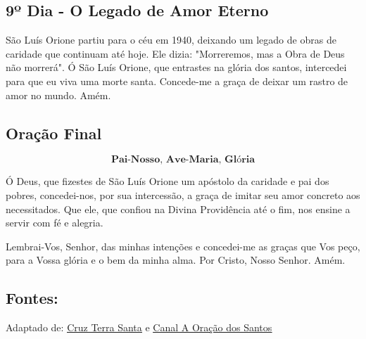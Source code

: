 \documentclass[a4paper,14pt]{extarticle} \usepackage[utf8]{inputenc}
\begin{document}
\underline{}


\subsection{9º Dia - O Legado de Amor Eterno}

\underline{}

São Luís Orione partiu para o céu em 1940, deixando um legado de obras de caridade que continuam até hoje. Ele dizia: "Morreremos, mas a Obra de Deus não morrerá".
Ó São Luís Orione, que entrastes na glória dos santos, intercedei para que eu viva uma morte santa. Concede-me a graça de deixar um rastro de amor no mundo. Amém.

\underline{}

\subsection{Oração Final}\label{sub:final} %

\[\textbf{Pai-Nosso, Ave-Maria, Glória}\]

Ó Deus, que fizestes de São Luís Orione um apóstolo da caridade e pai dos pobres, concedei-nos, por sua intercessão, a graça de imitar seu amor concreto aos necessitados. Que ele, que confiou na Divina Providência até o fim, nos ensine a servir com fé e alegria.

Lembrai-Vos, Senhor, das minhas intenções e concedei-me as graças que Vos peço, para a Vossa glória e o bem da minha alma. Por Cristo, Nosso Senhor. Amém.


\vfill

\begin{center}
\subsection*{Fontes:}
Adaptado de: {\color{blue} \underline{\href{https://cruzterrasanta.com.br/historia-de-sao-luis-orione/362/102/}{Cruz Terra Santa}}} e {\color{blue} \underline{\href{https://youtube.com/playlist?list=PLN7jQwkJvdQoCTF1o4mfX_l-SMaw4goe0&si=srrIsdAAgNtQvnvw}{Canal A Oração dos Santos}}}
\end{center}
\end{document}
